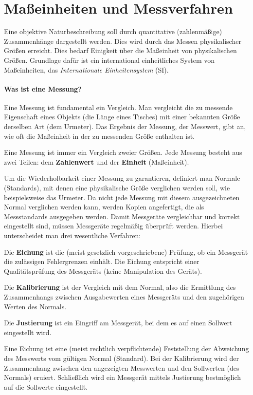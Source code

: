 \chapter{Maßeinheiten und Messverfahren}\label{chap: MasseinheitenMessverfahren}
Eine objektive Naturbeschreibung soll durch quantitative (zahlenmäßige) Zusammenhänge dargestellt werden. Dies wird durch das Messen physikalischer Größen erreicht. Dies bedarf Einigkeit über die Maßeinheit von physikalischen Größen. Grundlage dafür ist ein international einheitliches System von Maßeinheiten, das \textit{Internationale Einheitensystem} (SI).
\subsubsection{Was ist eine Messung?}
Eine Messung ist fundamental ein Vergleich. Man vergleicht die zu messende Eigenschaft eines Objekts (\zB die Länge eines Tisches) mit einer bekannten Größe derselben Art (\zB dem Urmeter). Das Ergebnis der Messung, der Messwert, gibt an, wie oft die Maßeinheit in der zu messenden Größe enthalten ist.
\begin{importantbox}[]{}
    Eine Messung ist immer ein Vergleich zweier Größen. Jede Messung besteht aus zwei Teilen: dem \textbf{Zahlenwert} und der \textbf{Einheit} (Maßeinheit).
\end{importantbox}
Um die Wiederholbarkeit einer Messung zu garantieren, definiert man Normale (Standards), mit denen eine physikalische Größe verglichen werden soll, wie beispielsweise das Urmeter. Da nicht jede Messung mit diesem ausgezeichneten Normal verglichen werden kann, werden Kopien angefertigt, die als Messstandards ausgegeben werden. Damit Messgeräte vergleichbar und korrekt eingestellt sind, müssen Messgeräte regelmäßig überprüft werden. Hierbei unterscheidet man drei wesentliche Verfahren:

\begin{rememberbox}[]{}
Die \textbf{Eichung} ist die (meist gesetzlich vorgeschriebene) Prüfung, ob ein Messgerät die zulässigen Fehlergrenzen einhält. Die Eichung entspricht einer Qualitätsprüfung des Messgeräts (keine Manipulation des Geräts). 

Die \textbf{Kalibrierung} ist der Vergleich mit dem Normal, also die Ermittlung des Zusammenhangs zwischen Ausgabewerten eines Messgeräts und den zugehörigen Werten des Normals. 

Die \textbf{Justierung} ist ein Eingriff am Messgerät, bei dem es auf einen Sollwert eingestellt wird.
\end{rememberbox}
Eine Eichung ist eine (meist rechtlich verpflichtende) Feststellung der Abweichung des Messwerts vom gültigen Normal (Standard). Bei der Kalibrierung wird der Zusammenhang zwischen den angezeigten Messwerten und den Sollwerten (des Normals) eruiert. Schließlich wird ein Messgerät mittels Justierung bestmöglich auf die Sollwerte eingestellt. \\

